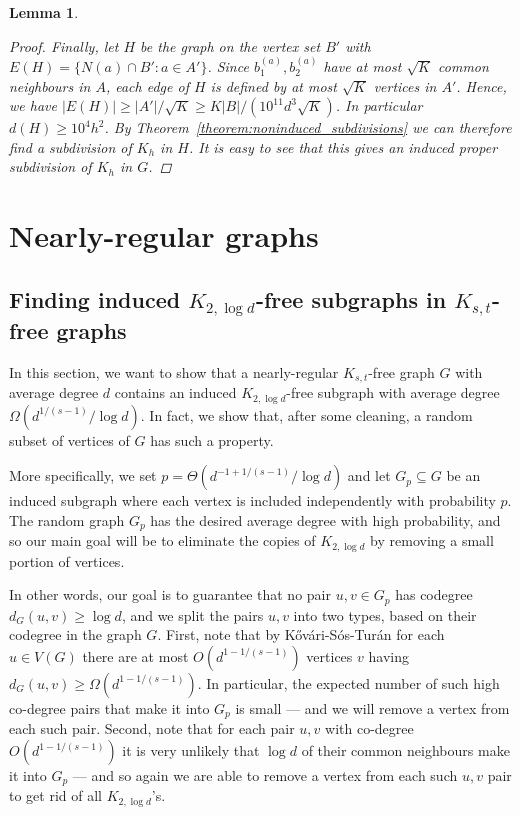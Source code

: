 \documentclass[10pt, a4paper]{article}
\numberwithin{theorem}{section} %
\newtheorem{lemma}[theorem]{Lemma}
\theoremstyle{remark}
\theoremstyle{definition}
\begin{document}
\begin{lemma}
\begin{proof}
        Finally, let $H$ be the graph on the vertex set $B'$ with $E(H) = \{N(a) \cap B': a \in A'\}$.
        Since $b_1^{(a)}, b_2^{(a)}$ have at most $\sqrt{K}$ common neighbours in $A$, each edge of $H$ is defined by at most $\sqrt{K}$ vertices in $A'$. Hence, we have $|E(H)| \geq |A'|/\sqrt{K} \geq K|B|/(10^{11}d^3\sqrt{K})$. In particular $d(H) \geq 10^4h^2$.
        By Theorem~\ref{theorem:noninduced_subdivisions} we can therefore find a subdivision of $K_h$ in $H$.
        It is easy to see that this gives an induced proper subdivision of $K_h$ in $G$.
    \end{proof}
\end{lemma}

\section{Nearly-regular graphs}\label{sec:nearly_regular}
\subsection{Finding induced $K_{2,\log d}$-free subgraphs in $K_{s, t}$-free graphs}
In this section, we want to show that a nearly-regular $K_{s, t}$-free graph $G$ with average degree $d$ contains an induced $K_{2, \log d}$-free subgraph with average degree $\Omega(d^{1/(s-1)}/\log d)$.
In fact, we show that, after some cleaning, a random subset of vertices of $G$ has such a property.

More specifically, we set $p = \Theta(d^{-1 + 1/(s-1)} /\log d)$ and let $G_p \subseteq G$ be an induced subgraph where each vertex is included independently with probability $p$.
The random graph $G_p$ has the desired average degree with high probability, and so our main goal will be to eliminate the copies of $K_{2, \log d}$ by removing a small portion of vertices.

In other words, our goal is to guarantee that no pair $u, v\in G_p$ has codegree $d_G(u, v)\geq \log d$, and we split the pairs $u, v$ into two types, based on their codegree in the graph $G$.  
First, note that by K\H{o}v\'ari-S\'os-Tur\'an for each $u \in V(G)$ there are at most $O(d^{1-1/(s-1)})$ vertices $v$ having $d_G(u, v)\geq \Omega(d^{1-1/(s-1)})$.
In particular, the expected number of such high co-degree pairs that make it into $G_p$ is small --- and we will remove a vertex from each such pair.
Second, note that for each pair $u, v$ with co-degree $O(d^{1-1/(s-1)})$ it is very unlikely that $\log d$ of their common neighbours make it into $G_p$ --- and so again we are able to remove a vertex from each such $u, v$ pair to get rid of all $K_{2, \log d}$'s. 
\end{document}
